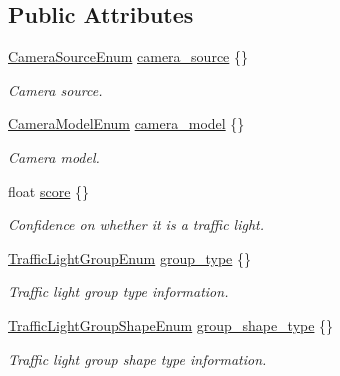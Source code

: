 \subsection*{Public Attributes}
\begin{DoxyCompactItemize}
\item 
\hyperlink{structmaf__perception__interface_1_1CameraSourceEnum}{Camera\+Source\+Enum} \hyperlink{structmaf__perception__interface_1_1PhysicalTrafficLightMultiFrame_ab346b27e4c4f4a3aea40d54fd469f131}{camera\+\_\+source} \{\}
\begin{DoxyCompactList}\small\item\em Camera source. \end{DoxyCompactList}\item 
\hyperlink{structmaf__perception__interface_1_1CameraModelEnum}{Camera\+Model\+Enum} \hyperlink{structmaf__perception__interface_1_1PhysicalTrafficLightMultiFrame_ac093cc8ea950c5e0ea96d6c37b0584a4}{camera\+\_\+model} \{\}
\begin{DoxyCompactList}\small\item\em Camera model. \end{DoxyCompactList}\item 
float \hyperlink{structmaf__perception__interface_1_1PhysicalTrafficLightMultiFrame_a0ca6dae314ac9f4aecc0b49d16887051}{score} \{\}
\begin{DoxyCompactList}\small\item\em Confidence on whether it is a traffic light. \end{DoxyCompactList}\item 
\hyperlink{structmaf__perception__interface_1_1TrafficLightGroupEnum}{Traffic\+Light\+Group\+Enum} \hyperlink{structmaf__perception__interface_1_1PhysicalTrafficLightMultiFrame_ad6757ff9a2f20945159ee6cdb8c99880}{group\+\_\+type} \{\}
\begin{DoxyCompactList}\small\item\em Traffic light group type information. \end{DoxyCompactList}\item 
\hyperlink{structmaf__perception__interface_1_1TrafficLightGroupShapeEnum}{Traffic\+Light\+Group\+Shape\+Enum} \hyperlink{structmaf__perception__interface_1_1PhysicalTrafficLightMultiFrame_a46bdd5947aeb090c21c546fd45ca16ab}{group\+\_\+shape\+\_\+type} \{\}
\begin{DoxyCompactList}\small\item\em Traffic light group shape type information. \end{DoxyCompactList}\item 

\end{DoxyCompactItemize}

